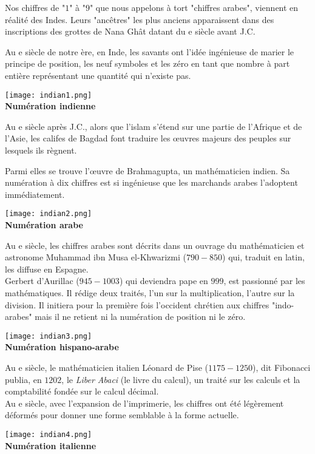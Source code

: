 \begin{His}
Nos chiffres de "$1$" à "$9$" que nous appelons à tort "chiffres arabes", viennent en réalité des Indes. Leurs "ancêtres" les plus anciens apparaissent dans des inscriptions des grottes de Nana Ghât datant du e siècle avant J.C.

Au e siècle de notre ère, en Inde, les savants ont l'idée ingénieuse de marier le principe de position, les neuf symboles et les zéro en tant que nombre à part entière représentant une quantité qui n'existe pas.

\begin{center}
\texttt{[image: indian1.png]}\\
\textbf{Numération indienne}
\end{center}

Au e siècle après J.C., alors que l'islam s'étend sur une partie de l'Afrique et de l'Asie, les califes de Bagdad font traduire les œuvres majeurs des peuples sur lesquels ils règnent.

Parmi elles se trouve l'œuvre de Brahmagupta, un mathématicien indien. Sa numération à dix chiffres est si ingénieuse que les marchands arabes l'adoptent immédiatement.

\begin{center}
\texttt{[image: indian2.png]}\\
\textbf{Numération arabe}
\end{center}
\end{His}

\begin{His}
Au e siècle, les chiffres arabes sont décrits dans un ouvrage du mathématicien et astronome Muhammad ibn Musa el-Khwarizmi ($790-850$) qui, traduit en latin, les diffuse en Espagne.\\

Gerbert d'Aurillac ($945-1003$) qui deviendra pape en $999$, est passionné par les mathématiques. Il rédige deux traités, l'un sur la multiplication, l'autre sur la division. Il initiera pour la première fois l'occident chrétien aux chiffres "indo-arabes" mais il ne retient ni la numération de position ni le zéro. 

\begin{center}
\texttt{[image: indian3.png]}\\
\textbf{Numération hispano-arabe}
\end{center}

Au e siècle, le mathématicien italien Léonard de Pise ($1175-1250$), dit Fibonacci publia, en $1202$, le \textit{Liber Abaci} (le livre du calcul), un traité sur les calculs et la comptabilité fondée sur le calcul décimal.\\

Au e siècle, avec l'expansion de l'imprimerie, les chiffres ont été légèrement déformés pour donner une forme semblable à la forme actuelle. 

\begin{center}
\texttt{[image: indian4.png]}\\
\textbf{Numération italienne}
\end{center}
\end{His}
